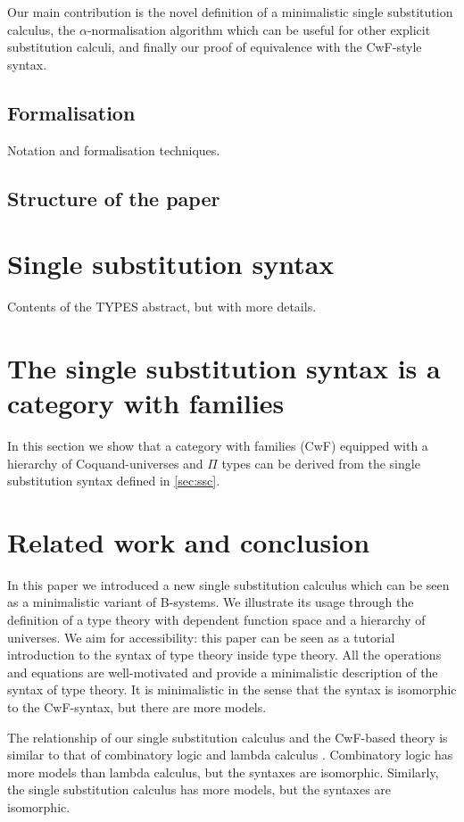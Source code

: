 \documentclass[a4paper]{article}
\begin{document}
Our main contribution is the novel definition of a minimalistic single
substitution calculus, the $\alpha$-normalisation algorithm which can
be useful for other explicit substitution calculi, and finally our
proof of equivalence with the CwF-style syntax.

\subsection{Formalisation}

Notation and formalisation techniques.

\subsection{Structure of the paper}

\section{Single substitution syntax}
\label{sec:ssc}

Contents of the TYPES abstract, but with more details.

\section{The single substitution syntax is a category with families}

In this section we show that a category with families (CwF) equipped
with a hierarchy of Coquand-universes and $\Pi$ types can be derived
from the single substitution syntax defined in \autoref{sec:ssc}.

\section{Related work and conclusion}

In this paper we introduced a new single substitution calculus which
can be seen as a minimalistic variant of B-systems. We illustrate its
usage through the definition of a type theory with dependent function
space and a hierarchy of universes. We aim for accessibility: this
paper can be seen as a tutorial introduction to the syntax of type
theory inside type theory. All the operations and equations are
well-motivated and provide a minimalistic description of the syntax of
type theory. It is minimalistic in the sense that the syntax is
isomorphic to the CwF-syntax, but there are more models. 

The relationship of our single substitution calculus and the CwF-based
theory is similar to that of combinatory logic and lambda calculus
\cite{DBLP:conf/fscd/AltenkirchKSV23}. Combinatory logic has more
models than lambda calculus, but the syntaxes are
isomorphic. Similarly, the single substitution calculus has more
models, but the syntaxes are isomorphic.
\end{document}
